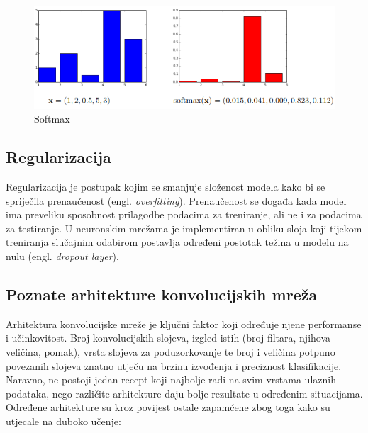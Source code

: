 \begin{figure}[htb]
    \centering
    \includegraphics[width=0.6\linewidth]{Chapters/neuronska_mreza/CNN/softmax.png} 
    \caption{Softmax \cite{snajder2023logreg}}
    \label{pic:softmax}
\end{figure}

\subsection{Regularizacija}
Regularizacija je postupak kojim se smanjuje složenost modela kako bi se spriječila
prenaučenost (engl. \textit{overfitting}). Prenaučenost se događa kada model ima preveliku  
sposobnost prilagodbe podacima za treniranje, ali ne i za podacima za testiranje.
U neuronskim mrežama je implementiran u obliku sloja koji tijekom
treniranja slučajnim odabirom postavlja određeni postotak 
težina u modelu na nulu (engl. \textit{dropout layer}).

\subsection{Poznate arhitekture konvolucijskih mreža}
Arhitektura konvolucijske mreže je ključni faktor koji određuje njene performanse i
učinkovitost. Broj konvolucijskih slojeva, izgled istih (broj filtara, njihova veličina,
pomak), vrsta slojeva za poduzorkovanje te broj i veličina potpuno povezanih slojeva znatno
utječu na brzinu izvođenja i preciznost klasifikacije. Naravno, ne postoji jedan recept koji
najbolje radi na svim vrstama ulaznih podataka, nego različite arhitekture daju bolje rezultate
u određenim situacijama. Određene arhitekture su kroz povijest ostale zapamćene zbog
toga kako su utjecale na duboko učenje\cite{indian}:

